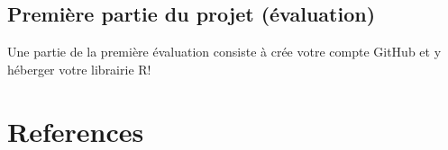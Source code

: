 \documentclass[
  letterpaper,
  DIV=11,
  numbers=noendperiod]{scrreprt}
\newlength{\cslhangindent}
\newenvironment{CSLReferences}[2] %
 {\begin{list}{}{%
  \setlength{\itemindent}{0pt}
  \setlength{\leftmargin}{0pt}
  \setlength{\parsep}{0pt}
  \ifodd #1
   \setlength{\leftmargin}{\cslhangindent}
   \setlength{\itemindent}{-1\cslhangindent}
  \fi
  \setlength{\itemsep}{#2\baselineskip}}}
 {\end{list}}
\begin{document}
\section{Première partie du projet
(évaluation)}\label{premiuxe8re-partie-du-projet-uxe9valuation}

Une partie de la première évaluation consiste à crée votre compte GitHub
et y héberger votre librairie R!


\chapter*{References}\label{references}


\label{refs}
\begin{CSLReferences}{0}{1}
\end{CSLReferences}
\end{document}
